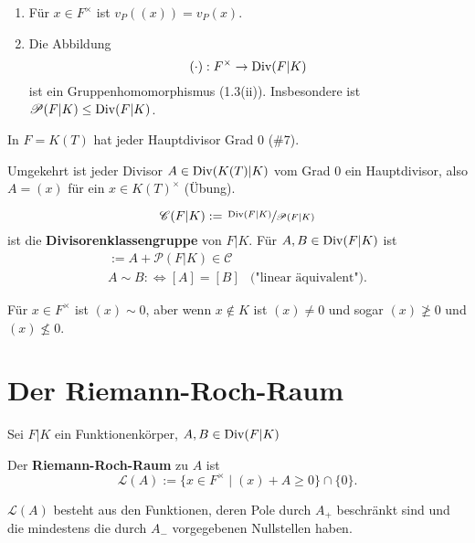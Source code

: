 \begin{bemerkungnr}
    \begin{enumerate}
        \item Für $x \in F^{\times}$ ist $v_P((x)) = v_P(x)$.
        \item Die Abbildung
        $$ (\cdot): F^{\times} \to \operatorname{Div}(F|K)$$
        ist ein Gruppenhomomorphismus (1.3(ii)). 
        Insbesondere ist $\mathscr{P}(F|K) \leq \operatorname{Div}(F|K)$.
    \end{enumerate}
\end{bemerkungnr}

\begin{beispiel}
    In $F=K(T)$ hat jeder Hauptdivisor Grad $0$ (\#7).

    Umgekehrt ist jeder Divisor $A \in \operatorname{Div}(K(T)|K)$ vom Grad $0$ ein Hauptdivisor, also
    $A = (x)$ für ein $x \in K(T)^{\times}$ (Übung).
\end{beispiel}

\begin{definition}
    $$ \mathscr{C}(F|K) := \sfrac{\operatorname{Div}(F|K)}{\mathscr{P}(F|K)}$$
    ist die \textbf{Divisorenklassengruppe} von $F|K$.
    Für $A,B \in \operatorname{Div}(F|K)$ ist
    \begin{align*}
        [A] := A + \mathscr{P}(F|K) \in \mathscr{C}\\
        A \sim B : \iff [A] = [B] & \text{("linear äquivalent")}.
    \end{align*}
\end{definition}

\begin{beispiel}
    Für $x \in F^{\times}$ ist $(x) \sim 0$, aber wenn $x \notin K$ ist $(x) \ne 0$ und sogar $(x) \not \geq 0$ und $(x) \not \leq 0$.
\end{beispiel}

\section{Der Riemann-Roch-Raum}
Sei $F|K$ ein Funktionenkörper, $A,B \in \operatorname{Div}(F|K)$

\begin{definition}
    Der \textbf{Riemann-Roch-Raum} zu $A$ ist 
    $$ \mathcal{L}(A) := \{x \in F^{\times} \mid (x) + A \geq 0\} \cap \{0\}.$$
\end{definition}

\begin{bemerkungnr}
    $\mathcal{L}(A)$ besteht aus den Funktionen, deren Pole durch $A_+$ beschränkt sind und die mindestens die
    durch $A_-$ vorgegebenen Nullstellen haben.
\end{bemerkungnr}

